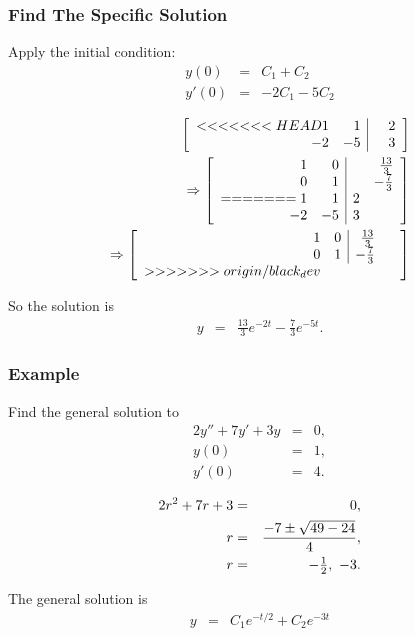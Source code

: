 \begin{frame}
  \frametitle{Find The Specific Solution}

  Apply the initial condition:
  \begin{eqnarray*}
    y(0) & = & C_1 + C_2 \\
    y'(0) & = & -2C_1 - 5 C_2
  \end{eqnarray*}

  \begin{eqnarray*}
    \left[ \begin{array}{rr|rr}
<<<<<<< HEAD
    1 & 1 &  & 2 \\ 
    -2 & -5 &  & 3 \\ 
    \end{array} \right] \\
    \Rightarrow
    \left[ \begin{array}{rr|rr}
    1 & 0 &  & \frac{13}{3} \\ 
    0 & 1 &  & -\frac{7}{3} \\ 
=======
    1 & 1 & 2 & ~ \\ 
    -2 & -5 & 3 & ~ \\ 
    \end{array} \right] \\
    \Rightarrow
    \left[ \begin{array}{rr|rr}
    1 & 0 & \frac{13}{3} & ~ \\ 
    0 & 1 & -\frac{7}{3} & ~ \\ 
>>>>>>> origin/black_dev
    \end{array} \right]
  \end{eqnarray*}

  So the solution is
  \begin{eqnarray*}
    y & = & \frac{13}{3} e^{-2t} - \frac{7}{3} e^{-5t}.
  \end{eqnarray*}
  

\end{frame}


\begin{frame}
  \frametitle{Example}

  Find the general solution to
  \begin{eqnarray*}
    2y'' + 7y' + 3y & = & 0, \\
    y(0) & = & 1, \\
    y'(0) & = & 4.
  \end{eqnarray*}

  {
    \begin{eqnarray*}
      2r^2 + 7r + 3 & = & 0, \\
      r & = & \frac{-7\pm\sqrt{49-24}}{4}, \\
      r & = & -\mbox{$\frac{1}{2}$},~-3.
    \end{eqnarray*}

    The general solution is
    \begin{eqnarray*}
      y & = & C_1 e^{-t/2} + C_2 e^{-3t}
    \end{eqnarray*}

  }
  

\end{frame}


